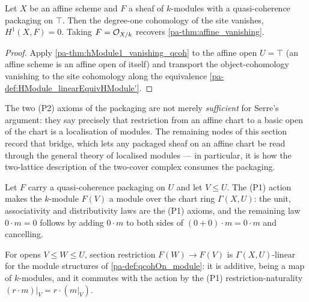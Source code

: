\begin{theorem}
  \label{pa-thm:hModule_vanishing_qcoh}
  \leanok

  Let \(X\) be an affine scheme and \(F\) a sheaf of \(k\)-modules with a quasi-coherence
  packaging on \(\top\). Then the degree-one cohomology of the site vanishes,
  \(H^1(X, F) = 0\). Taking \(F = \mathcal{O}_{X/k}\) recovers \ref{pa-thm:affine_vanishing}.
\end{theorem}
\begin{proof}
  \leanok
  Apply \ref{pa-thm:hModule1_vanishing_qcoh} to the affine open \(U = \top\) (an affine scheme is an
  affine open of itself) and transport the object-cohomology vanishing to the site cohomology
  along the equivalence \ref{pa-def:HModule_linearEquivHModule'}.
\end{proof}

The two (P2) axioms of the packaging are not merely \emph{sufficient} for Serre's argument:
they say precisely that restriction from an affine chart to a basic open of the chart is a
localisation of modules. The remaining nodes of this section record that bridge, which lets
any packaged sheaf on an affine chart be read through the general theory of localised
modules --- in particular, it is how the two-lattice description of the two-cover complex
consumes the packaging.

\begin{definition}
  \label{pa-def:qcohOn_module}
  \leanok

  Let \(F\) carry a quasi-coherence packaging on \(U\) and let \(V \le U\). The (P1) action
  makes the \(k\)-module \(F(V)\) a module over the chart ring \(\Gamma(X, U)\): the unit,
  associativity and distributivity laws are the (P1) axioms, and the remaining law
  \(0 \cdot m = 0\) follows by adding \(0 \cdot m\) to both sides of
  \((0 + 0) \cdot m = 0 \cdot m\) and cancelling.
\end{definition}

\begin{definition}
  \label{pa-def:qcohOn_secRes_linear}
  \leanok

  For opens \(V \le W \le U\), section restriction \(F(W) \to F(V)\) is
  \(\Gamma(X, U)\)-linear for the module structures of \ref{pa-def:qcohOn_module}: it is
  additive, being a map of \(k\)-modules, and it commutes with the action by the (P1)
  restriction-naturality \((r \cdot m)|_V = r \cdot (m|_V)\).
\end{definition}

